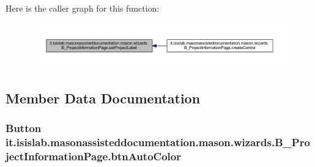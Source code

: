 Here is the caller graph for this function\-:\nopagebreak
\begin{figure}[H]
\begin{center}
\leavevmode
\includegraphics[width=350pt]{classit_1_1isislab_1_1masonassisteddocumentation_1_1mason_1_1wizards_1_1_b___project_information_page_af5afa21c1d0087572ad8b3d0a1a1fe9c_icgraph}
\end{center}
\end{figure}




\subsection{Member Data Documentation}
\hypertarget{classit_1_1isislab_1_1masonassisteddocumentation_1_1mason_1_1wizards_1_1_b___project_information_page_a1c3cf5ff2d1b0d408f03db81e8e40c6a}{
\subsubsection[{btn\-Auto\-Color}]{\setlength{\rightskip}{0pt plus 5cm}Button it.\-isislab.\-masonassisteddocumentation.\-mason.\-wizards.\-B\-\_\-\-Project\-Information\-Page.\-btn\-Auto\-Color\hspace{0.3cm}{\ttfamily [private]}}}\label{classit_1_1isislab_1_1masonassisteddocumentation_1_1mason_1_1wizards_1_1_b___project_information_page_a1c3cf5ff2d1b0d408f03db81e8e40c6a}
